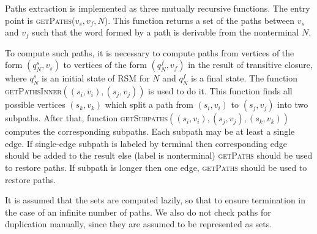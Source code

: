 Paths extraction is implemented as three mutually recursive functions.
The entry point is \textsc{getPaths}($v_s, v_f, N$).
This function returns a set of the paths between $v_s$ and $v_f$ such that the word formed by a path is derivable from the nonterminal $N$.

To compute such paths, it is necessary to compute paths from vertices of the form $(q_N^s,v_s)$ to vertices of the form $(q_N^f, v_f)$ in the result of transitive closure, where $q_N^s$ is an initial state of RSM for $N$ and $q_N^f$ is a final state.
The function \textsc{getPathsInner}$((s_i,v_i),(s_j,v_j))$ is used to do it.
This function finds all possible vertices $(s_k,v_k)$  which split a path from $(s_i,v_i)$ to $(s_j,v_j)$ into two subpaths.
After that, function \textsc{getSubpaths}$((s_i,v_i),(s_j,v_j),(s_k,v_k))$ computes the corresponding subpaths.
Each subpath may be at least a single edge.
If single-edge subpath is labeled by terminal then corresponding edge should be added to the result else (label is nonterminal) \textsc{getPaths} should be used to restore paths.
If subpath is longer then one edge, \textsc{getPaths} should be used to restore paths. 

It is assumed that the sets are computed lazily, so that to ensure termination in the case of an infinite number of paths.
We also do not check paths for duplication manually, since they are assumed to be represented as sets.
